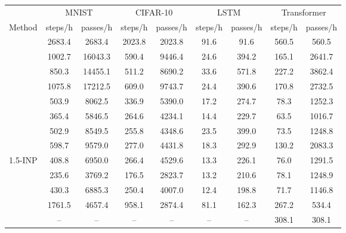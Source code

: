 \begin{tabular}{l cc cc cc cc}
\toprule
 & \multicolumn{2}{c}{MNIST} & \multicolumn{2}{c}{CIFAR-10} & \multicolumn{2}{c}{LSTM} & \multicolumn{2}{c}{Transformer} \\
\cmidrule(lr){2-3}\cmidrule(lr){4-5}\cmidrule(lr){6-7}\cmidrule(lr){8-9}
Method & steps/h & passes/h & steps/h & passes/h & steps/h & passes/h & steps/h & passes/h \\
\midrule
\BP{} & 2683.4 & 2683.4 & 2023.8 & 2023.8 & 91.6 & 91.6 & 560.5 & 560.5 \\
\SPSA{} & 1002.7 & 16043.3 & 590.4 & 9446.4 & 24.6 & 394.2 & 165.1 & 2641.7 \\
\SPSAb{} & 850.3 & 14455.1 & 511.2 & 8690.2 & 33.6 & 571.8 & 227.2 & 3862.4 \\
\RS{} & 1075.8 & 17212.5 & 609.0 & 9743.7 & 24.4 & 390.6 & 170.8 & 2732.5 \\
\NP{} & 503.9 & 8062.5 & 336.9 & 5390.0 & 17.2 & 274.7 & 78.3 & 1252.3 \\
\ANP{} & 365.4 & 5846.5 & 264.6 & 4234.1 & 14.4 & 229.7 & 63.5 & 1016.7 \\
\ANPb{} & 502.9 & 8549.5 & 255.8 & 4348.6 & 23.5 & 399.0 & 73.5 & 1248.8 \\
\INP{} & 598.7 & 9579.0 & 277.0 & 4431.8 & 18.3 & 292.9 & 130.2 & 2083.3 \\
1.5-INP & 408.8 & 6950.0 & 266.4 & 4529.6 & 13.3 & 226.1 & 76.0 & 1291.5 \\
\DUST{} & 235.6 & 3769.2 & 176.5 & 2823.7 & 13.2 & 210.6 & 78.1 & 1248.9 \\
\DANP{} & 430.3 & 6885.3 & 250.4 & 4007.0 & 12.4 & 198.8 & 71.7 & 1146.8 \\
\FF{} & 1761.5 & 4657.4 & 958.1 & 2874.4 & 81.1 & 162.3 & 267.2 & 534.4 \\
\IPC{} & -- & -- & -- & -- & -- & -- & 308.1 & 308.1 \\
\bottomrule
\end{tabular}
